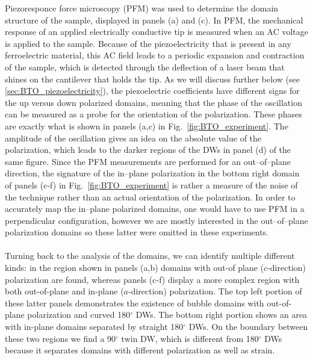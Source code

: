 Piezoresponce force microscopy (PFM)\cite{Harnagea2001} was used to determine the domain structure of the sample, displayed in panels (a) and (c).
In PFM, the mechanical response of an applied electrically conductive tip is measured when an AC voltage is applied to the sample.
Because of the piezoelectricity that is present in any ferroelectric material, this AC field leads to a periodic expansion and contraction of the sample, which is detected through the deflection of a laser beam that shines on the cantilever that holds the tip.
As we will discuss further below (see \ref{sec:BTO_piezoelectricity}), the piezoelectric coefficients have different signs for the up versus down polarized domains, meaning that the phase of the oscillation can be measured as a probe for the orientation of the polarization.
These phases are exactly what is shown in panels (a,c) in Fig.~\ref{fig:BTO_experiment}. The amplitude of the oscillation gives an idea on the absolute value of the polarization, which leads to the darker regions of the DWs in panel (d) of the same figure.
Since the PFM measurements are performed for an out--of--plane direction, the signature of the in--plane polarization in the bottom right domain of panels (c-f) in Fig.~\ref{fig:BTO_experiment} is rather a measure of the noise of the technique rather than an actual orientation of the polarization.
In order to accurately map the in--plane polarized domains, one would have to use PFM in a perpendicular configuration, however we are mostly interested in the out--of--plane polarization domains so these latter were omitted in these experiments.
\\\\
Turning back to the analysis of the domains, we can identify multiple different kinds: in the region shown in panels (a,b) domains with out-of plane ($c$-direction) polarization are found, whereas panels (c-f) display a more complex region with both out-of-plane and in-plane ($a$-direction) polarization.
The top left portion of these latter panels demonstrates the existence of bubble domains with out-of-plane polarization and curved 180$^\circ$ DWs.
The bottom right portion shows an area with in-plane domains separated by straight 180$^\circ$ DWs.
On the boundary between these two regions we find a 90$^\circ$ twin DW, which is different from 180$^\circ$ DWs because it separates domains with different polarization as well as strain.

